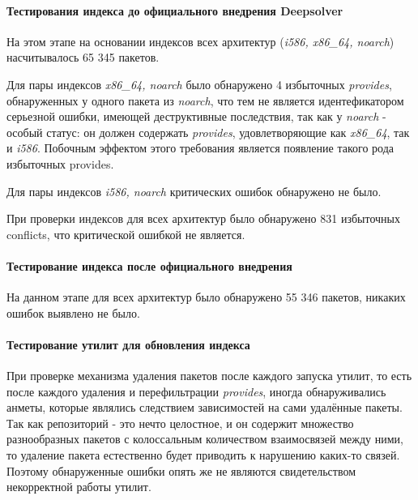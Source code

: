 \paragraph{Тестирования индекса до официального внедрения Deepsolver\\}
На этом этапе на основании индексов всех архитектур (\textit{i586, x86\_64, noarch})
насчитывалось 65 345 пакетов.

Для пары индексов  \textit{x86\_64, noarch} было обнаружено 4 избыточных \textit{provides}, 
обнаруженных у одного пакета из \textit{noarch}, что тем не является идентефикатором серьезной
ошибки, имеющей деструктивные последствия, так как у \textit{noarch} - особый статус: он должен
содержать \textit{provides}, удовлетворяющие как \textit{x86\_64}, так и \textit{i586}. Побочным
эффектом этого требования является появление такого рода избыточных provides.

Для пары индексов \textit{i586, noarch} критических ошибок обнаружено не было.

При проверки индексов для всех архитектур было обнаружено 831 избыточных conflicts, что
критической ошибкой не является.

\paragraph{Тестирование индекса после официального внедрения\\}
На данном этапе для всех архитектур было обнаружено 55 346 пакетов, никаких
ошибок выявлено не было.\\

\paragraph{Тестирование утилит для обновления индекса}
При проверке механизма удаления пакетов после каждого  запуска утилит, то есть
после каждого удаления и перефильтрации \textit{provides}, иногда обнаруживались
анметы, которые являлись следствием зависимостей на сами удалённые пакеты. Так 
как репозиторий - это нечто целостное, и он содержит множество разнообразных пакетов
с колоссальным количеством взаимосвязей между ними, то удаление пакета
естественно будет приводить к нарушению каких-то связей. Поэтому обнаруженные ошибки
опять же не являются свидетельством некорректной работы утилит.













